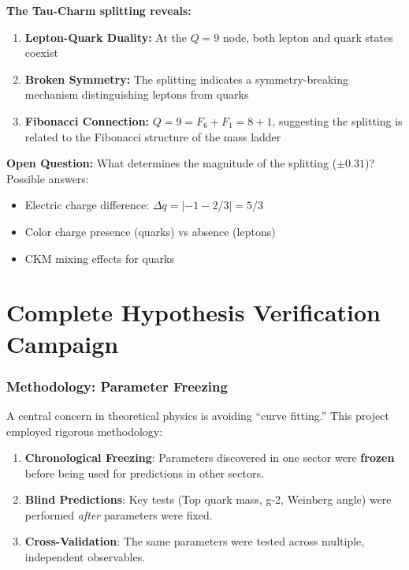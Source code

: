 \documentclass[11pt, a4paper]{article}
\theoremstyle{remark}
\begin{document}
\textbf{The Tau-Charm splitting reveals:}
\begin{enumerate}
    \item \textbf{Lepton-Quark Duality:} At the $Q = 9$ node, both lepton and quark states coexist
    \item \textbf{Broken Symmetry:} The splitting indicates a symmetry-breaking mechanism distinguishing leptons from quarks
    \item \textbf{Fibonacci Connection:} $Q = 9 = F_6 + F_1 = 8 + 1$, suggesting the splitting is related to the Fibonacci structure of the mass ladder
\end{enumerate}

\textbf{Open Question:} What determines the magnitude of the splitting ($\pm 0.31$)? Possible answers:
\begin{itemize}
    \item Electric charge difference: $\Delta q = |-1 - 2/3| = 5/3$
    \item Color charge presence (quarks) vs absence (leptons)
    \item CKM mixing effects for quarks
\end{itemize}

\newpage
\part{Complete Hypothesis Verification Campaign}

\section{Methodology: Parameter Freezing}

A central concern in theoretical physics is avoiding ``curve fitting.'' This project employed rigorous methodology:

\begin{enumerate}
    \item \textbf{Chronological Freezing}: Parameters discovered in one sector were \textbf{frozen} before being used for predictions in other sectors.
    
    \item \textbf{Blind Predictions}: Key tests (Top quark mass, g-2, Weinberg angle) were performed \textit{after} parameters were fixed.
    
    \item \textbf{Cross-Validation}: The same parameters were tested across multiple, independent observables.
\end{enumerate}
\end{document}
